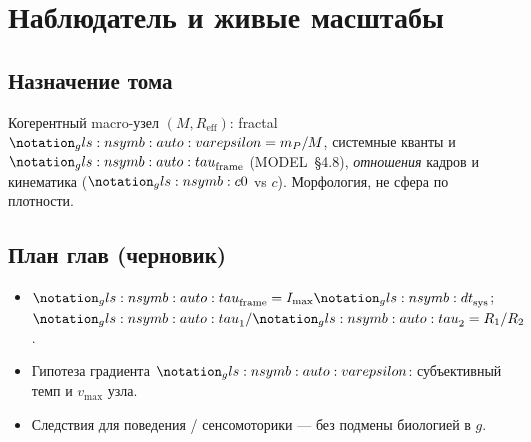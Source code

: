 \part{Наблюдатель и живые масштабы}

\chapter{Назначение тома}
Когерентный macro-узел $(M, R_{\mathrm{eff}})$: fractal $\symVarepsilon = m_P/M$,
системные кванты и $\symTau_{\mathrm{frame}}$ (MODEL~\S4.8), \emph{отношения} кадров
и кинематика ($\caSignalSpeed$ vs $c$). Морфология, не сфера по плотности.

\chapter{План глав (черновик)}
\begin{itemize}
  \item $\symTau_{\mathrm{frame}} = I_{\max}\caStepTime_{\mathrm{sys}}$; $\symTau_1/\symTau_2 = R_1/R_2$.
  \item Гипотеза градиента $\symVarepsilon$: субъективный темп и $v_{\max}$ узла.
  \item Следствия для поведения / сенсомоторики --- без подмены биологией в $g$.
\end{itemize}




